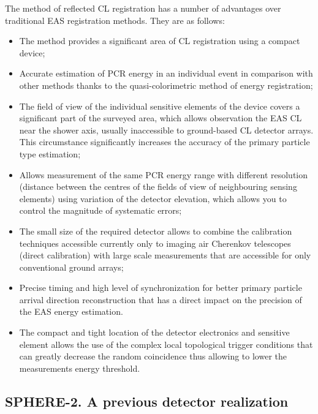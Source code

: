 \documentclass[a4paper,11pt]{article}
\begin{document}
The method of reflected CL registration has a number of advantages over traditional EAS registration methods. They are as follows:
\begin{itemize}
\item The method provides a significant area of CL registration using a compact device;
\item Accurate estimation of PCR energy in an individual event in comparison with other methods thanks to the quasi-colorimetric method of energy registration;
\item The field of view of the individual sensitive elements of the device covers a significant part of the surveyed area, which allows observation the EAS CL near the shower axis, usually inaccessible to ground-based CL detector arrays. This circumstance significantly increases the accuracy of the primary particle type estimation;
\item Allows measurement of the same PCR energy range with different resolution (distance between the centres of the fields of view of neighbouring sensing elements) using variation of the detector elevation, which allows you to control the magnitude of systematic errors;
\item The small size of the required detector allows to combine the calibration techniques accessible currently only to imaging air Cherenkov telescopes (direct calibration) with large scale measurements that are accessible for only conventional ground arrays;
\item Precise timing and high level of synchronization for better primary particle arrival direction reconstruction that has a direct impact on the precision of the EAS energy estimation.
\item The compact and tight location of the detector electronics and sensitive element allows the use of the  complex local topological trigger conditions that can greatly decrease the random coincidence thus allowing to lower the measurements energy threshold.
\end{itemize}

\subsection{SPHERE-2. A previous detector realization}
\end{document}
